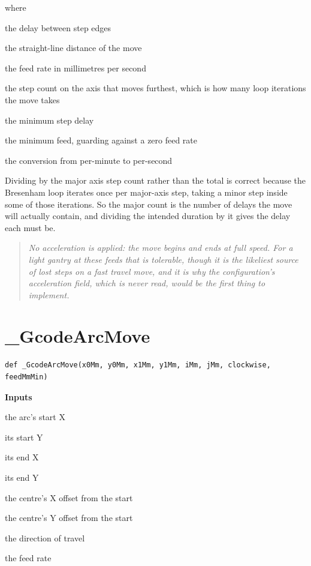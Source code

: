 \noindent where
\begin{description}[leftmargin=2.4em,style=nextline,font=\normalfont\ttfamily]\setlength\itemsep{1pt}
  \item[{$t_{\mathrm{step}}$}] \normalfont the delay between step edges
  \item[{$d_{\mathrm{mm}}$}] \normalfont the straight-line distance of the move
  \item[{$v$}] \normalfont the feed rate in millimetres per second
  \item[{$\mathrm{majorSteps}$}] \normalfont the step count on the axis that moves furthest, which is how many loop iterations the move takes
  \item[{$t_{\min}$}] \normalfont the minimum step delay
  \item[{$v_{\min}$}] \normalfont the minimum feed, guarding against a zero feed rate
  \item[{$60$}] \normalfont the conversion from per-minute to per-second
\end{description}
Dividing by the major axis step count rather than the total is correct because the Bresenham loop iterates once per major-axis step, taking a minor step inside some of those iterations. So the major count is the number of delays the move will actually contain, and dividing the intended duration by it gives the delay each must be.


\begin{quote}\small\itshape No acceleration is applied: the move begins and ends at full speed. For a light gantry at these feeds that is tolerable, though it is the likeliest source of lost steps on a fast travel move, and it is why the configuration's acceleration field, which is never read, would be the first thing to implement.\end{quote}

\section{\_GcodeArcMove}
\begin{lstlisting}[style=sig]
def _GcodeArcMove(x0Mm, y0Mm, x1Mm, y1Mm, iMm, jMm, clockwise, feedMmMin)
\end{lstlisting}

\noindent\textbf{Inputs}
\begin{description}[leftmargin=2.2em,style=nextline,font=\normalfont\ttfamily]\setlength\itemsep{1pt}
  \item[{x0Mm}] \normalfont the arc's start X
  \item[{y0Mm}] \normalfont its start Y
  \item[{x1Mm}] \normalfont its end X
  \item[{y1Mm}] \normalfont its end Y
  \item[{iMm}] \normalfont the centre's X offset from the start
  \item[{jMm}] \normalfont the centre's Y offset from the start
  \item[{clockwise}] \normalfont the direction of travel
  \item[{feedMmMin}] \normalfont the feed rate
\end{description}

